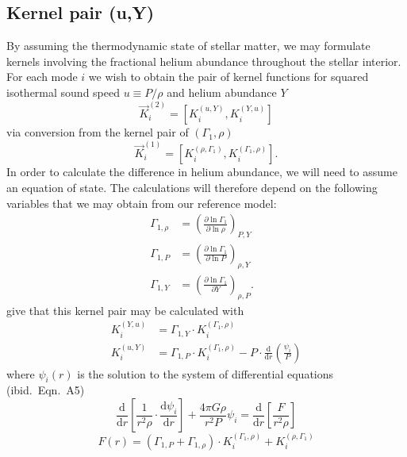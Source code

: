 \documentclass[twocolumn,twocolappendix]{aastex6}
\newcommand{\ddr}{\frac{\text{d}}{\text{d}r}}
\newcommand{\ddra}[1]{\frac{\text{d} #1}{\text{d}r}}
\newcommand{\Gr}{\Gamma_{1,\rho}}
\newcommand{\GP}{\Gamma_{1,P}}
\newcommand{\GY}{\Gamma_{1,Y}}
\newcommand{\KuY}{K_i^{(u,Y)}}
\newcommand{\KYu}{K_i^{(Y,u)}}
\newcommand{\KGr}{K_i^{(\Gamma_1,\rho)}}
\newcommand{\KrG}{K_i^{(\rho, \Gamma_1)}}
\begin{document}
\subsection{Kernel pair (u,Y)} \label{sec:KuY}
By assuming the thermodynamic state of stellar matter, we may formulate kernels involving the fractional helium abundance throughout the stellar interior. For each mode $i$ we wish to obtain the pair of kernel functions for squared isothermal sound speed $u \equiv P/\rho$ and helium abundance $Y$
\begin{equation}
    \vec K^{(2)}_i = \left[ \KuY, \KYu \right]
\end{equation}
via conversion from the kernel pair of $(\Gamma_1, \rho)$
\begin{equation}
    \vec K^{(1)}_i = \left[ \KrG, \KGr \right].
\end{equation}
In order to calculate the difference in helium abundance, we will need to assume an equation of state. The calculations will therefore depend on the following variables that we may obtain from our reference model:
\begin{align}
    \Gr &= \left( \frac{\partial \ln \Gamma_1}{\partial \ln \rho} \right)_{P, Y} \quad 
     \\ \GP &= \left( \frac{\partial \ln \Gamma_1}{\partial \ln P} \right)_{\rho, Y} \quad
\\ \GY &= \left( \frac{\partial \ln \Gamma_1}{\partial Y} \right)_{\rho, P}.
\end{align} 
\citet[][Eqn.\ A9]{ThompsonJCD2002} give that this kernel pair may be calculated with
\begin{align}
    \KYu &= \GY \cdot \KGr
\\  \KuY &= \GP \cdot \KGr - P \cdot \ddr \left( \frac{\psi_i}{P} \right)  \label{eq:Gough-JCD-KuY}
\end{align}
where $\psi_i(r)$ is the solution to the system of differential equations (ibid.\ Eqn.\ A5)
\begin{equation} \label{eq:bvp}
    \ddr \left[ \frac{1}{r^2 \rho} \cdot \ddra{\psi_i} \right]
    +
    \frac{4\pi G \rho}{r^2 P} \psi_i
    =
    \ddr \left[ \frac{F}{r^2 \rho} \right]
\end{equation}
\begin{equation}
    F(r) = (\GP + \Gr) \cdot \KGr + \KrG
\end{equation}
\end{document}
